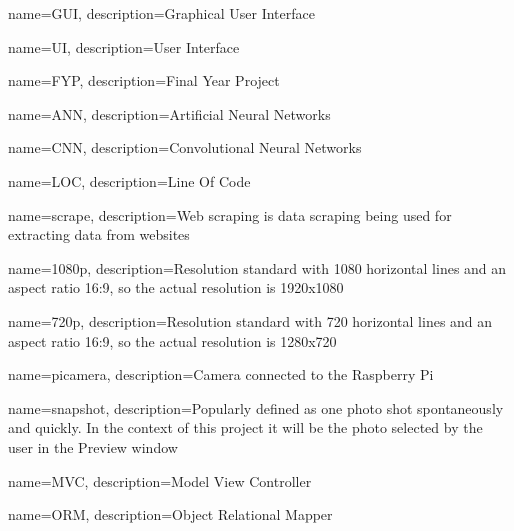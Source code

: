 {
        name=GUI,
        description={Graphical User Interface}
}

{
        name=UI,
        description={User Interface}
}

{
        name=FYP,
        description={Final Year Project}
}

{
        name=ANN,
        description={Artificial Neural Networks}
}

{
        name=CNN,
        description={Convolutional Neural Networks}
}

{
        name=LOC,
        description={Line Of Code}
}

{
        name=scrape,
        description={Web scraping is data scraping being used for extracting data from websites}
}

{
        name=1080p,
        description={Resolution standard with 1080 horizontal lines and an aspect ratio 16:9, so the actual resolution is 1920x1080}
}

{
        name=720p,
        description={Resolution standard with 720 horizontal lines and an aspect ratio 16:9, so the actual resolution is 1280x720}
}

{
        name=picamera,
        description={Camera connected to the Raspberry Pi}
}

{
        name=snapshot,
        description={Popularly defined as one photo shot spontaneously and quickly. In the context of this project it will be the photo selected by the user in the Preview window}
}

{
        name=MVC,
        description={Model View Controller}
}

{
        name=ORM,
        description={Object Relational Mapper}
}


% 
